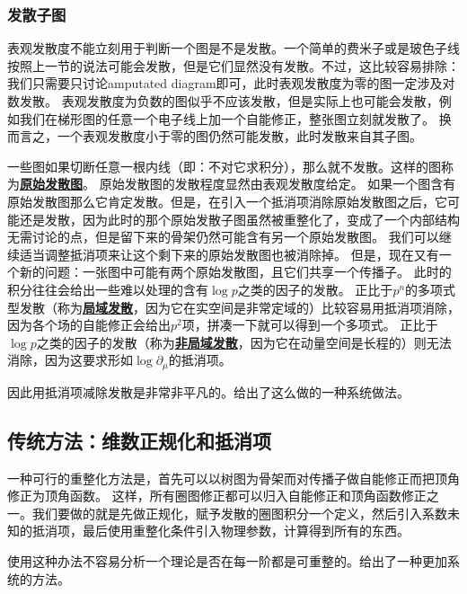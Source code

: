 \documentclass[hyperref, UTF8, a4paper]{ctexart}
\renewcommand{\autoref}{\prettyref}
\newcommand{\concept}[1]{\underline{\textbf{#1}}}
\begin{document}
\subsubsection{发散子图}

表观发散度不能立刻用于判断一个图是不是发散。一个简单的费米子或是玻色子线按照上一节的说法可能会发散，但是它们显然没有发散。不过，这比较容易排除：我们只需要只讨论amputated diagram即可，此时表观发散度为零的图一定涉及对数发散。
表观发散度为负数的图似乎不应该发散，但是实际上也可能会发散，例如我们在梯形图的任意一个电子线上加一个自能修正，整张图立刻就发散了。
换而言之，一个表观发散度小于零的图仍然可能发散，此时发散来自其子图。

一些图如果切断任意一根内线（即：不对它求积分），那么就不发散。这样的图称为\concept{原始发散图}。
原始发散图的发散程度显然由表观发散度给定。
如果一个图含有原始发散图那么它肯定发散。但是，在引入一个抵消项消除原始发散图之后，它可能还是发散，因为此时的那个原始发散子图虽然被重整化了，变成了一个内部结构无需讨论的点，但是留下来的骨架仍然可能含有另一个原始发散图。
我们可以继续适当调整抵消项来让这个剩下来的原始发散图也被消除掉。
但是，现在又有一个新的问题：一张图中可能有两个原始发散图，且它们共享一个传播子。
此时的积分往往会给出一些难以处理的含有$\log p$之类的因子的发散。
正比于$p^n$的多项式型发散（称为\concept{局域发散}，因为它在实空间是非常定域的）比较容易用抵消项消除，因为各个场的自能修正会给出$p^2$项，拼凑一下就可以得到一个多项式。
正比于$\log p$之类的因子的发散（称为\concept{非局域发散}，因为它在动量空间是长程的）则无法消除，因为这要求形如$\log \partial_\mu$的抵消项。

因此用抵消项减除发散是非常非平凡的。\autoref{sec:bphz}给出了这么做的一种系统做法。

\subsection{传统方法：维数正规化和抵消项}

一种可行的重整化方法是，首先可以以树图为骨架而对传播子做自能修正而把顶角修正为顶角函数。
这样，所有圈图修正都可以归入自能修正和顶角函数修正之一。我们要做的就是先做正规化，赋予发散的圈图积分一个定义，然后引入系数未知的抵消项，最后使用重整化条件引入物理参数，计算得到所有的东西。

使用这种办法不容易分析一个理论是否在每一阶都是可重整的。\autoref{sec:bphz}给出了一种更加系统的方法。
\end{document}
